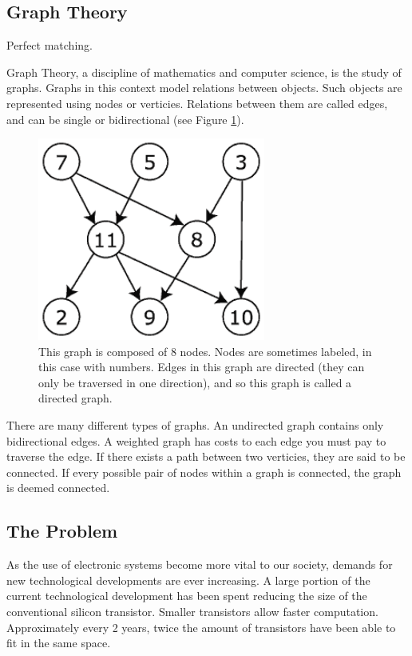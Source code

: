 \documentclass[12pt]{article}
\begin{document}
\subsection{Graph Theory}

Perfect matching. 


Graph Theory, a discipline of mathematics and computer science, is the study of graphs. Graphs in this context model relations between objects. Such objects are represented using nodes or verticies. Relations between them are called edges, and can be single or bidirectional (see Figure \ref{fig:graph}).  

\begin{figure}[ht!]
\centering
\includegraphics[width=75mm]{graph.png}
\caption{This graph is composed of 8 nodes. Nodes are sometimes labeled, in this case with numbers. Edges in this graph are directed (they can only be traversed in one direction), and so this graph is called a directed graph.}
\label{fig:graph}
\end{figure}

There are many different types of graphs. An undirected graph contains only bidirectional edges. A weighted graph has costs to each edge you must pay to traverse the edge. If there exists a path between two verticies, they are said to be connected. If every possible pair of nodes within a graph is connected, the graph is deemed connected. 

\subsection{The Problem}

As the use of electronic systems become more vital to our society, demands for new technological developments are ever increasing. %
A large portion of the current technological development has been spent reducing the size of the conventional silicon transistor. Smaller transistors allow faster computation. Approximately every 2 years, twice the amount of transistors have been able to fit in the same space.
\end{document}
